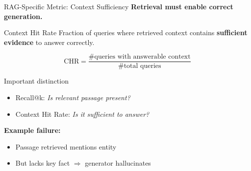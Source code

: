 \documentclass[aspectratio=169, xcolor=table]{beamer}
\newif\ifanimated
\newcommand{\cpause}{\ifanimated\pause\fi}
\begin{document}
\begin{frame}[shrink=10]{RAG-Specific Metric: Context Sufficiency}
\textbf{Retrieval must enable correct generation.}

\vspace{0.7em}
\begin{block}{Context Hit Rate}
Fraction of queries where retrieved context contains
\textbf{sufficient evidence} to answer correctly.

\vspace{0.4em}
\[
\text{CHR} =
\frac{\# \text{queries with answerable context}}
{\# \text{total queries}}
\]
\end{block}

\cpause
\begin{block}{Important distinction}
\begin{itemize}
  \item Recall@k: \textit{Is relevant passage present?}
  \item Context Hit Rate: \textit{Is it sufficient to answer?}
\end{itemize}
\end{block}

\vspace{0.5em}
\textbf{Example failure:}
\begin{itemize}
  \item Passage retrieved mentions entity
  \item But lacks key fact $\Rightarrow$ generator hallucinates
\end{itemize}
\end{frame}
\end{document}
